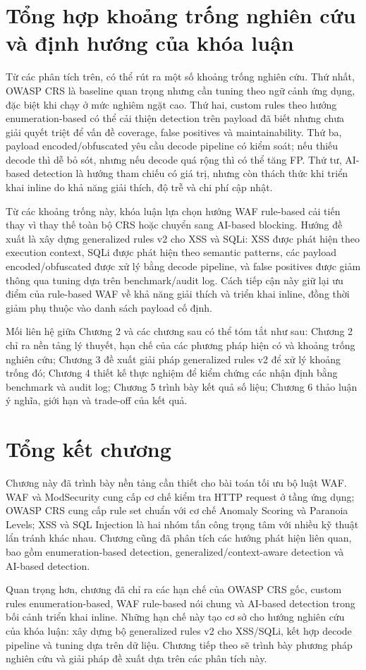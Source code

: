 \section{Tổng hợp khoảng trống nghiên cứu và định hướng của khóa luận}
\label{sec:research-gap}

Từ các phân tích trên, có thể rút ra một số khoảng trống nghiên cứu. Thứ nhất, OWASP CRS là baseline quan trọng nhưng cần tuning theo ngữ cảnh ứng dụng, đặc biệt khi chạy ở mức nghiêm ngặt cao. Thứ hai, custom rules theo hướng enumeration-based có thể cải thiện detection trên payload đã biết nhưng chưa giải quyết triệt để vấn đề coverage, false positives và maintainability. Thứ ba, payload encoded/obfuscated yêu cầu decode pipeline có kiểm soát; nếu thiếu decode thì dễ bỏ sót, nhưng nếu decode quá rộng thì có thể tăng FP. Thứ tư, AI-based detection là hướng tham chiếu có giá trị, nhưng còn thách thức khi triển khai inline do khả năng giải thích, độ trễ và chi phí cập nhật.

Từ các khoảng trống này, khóa luận lựa chọn hướng WAF rule-based cải tiến thay vì thay thế toàn bộ CRS hoặc chuyển sang AI-based blocking. Hướng đề xuất là xây dựng generalized rules v2 cho XSS và SQLi: XSS được phát hiện theo execution context, SQLi được phát hiện theo semantic patterns, các payload encoded/obfuscated được xử lý bằng decode pipeline, và false positives được giảm thông qua tuning dựa trên benchmark/audit log. Cách tiếp cận này giữ lại ưu điểm của rule-based WAF về khả năng giải thích và triển khai inline, đồng thời giảm phụ thuộc vào danh sách payload cố định.

Mối liên hệ giữa Chương 2 và các chương sau có thể tóm tắt như sau: Chương 2 chỉ ra nền tảng lý thuyết, hạn chế của các phương pháp hiện có và khoảng trống nghiên cứu; Chương 3 đề xuất giải pháp generalized rules v2 để xử lý khoảng trống đó; Chương 4 thiết kế thực nghiệm để kiểm chứng các nhận định bằng benchmark và audit log; Chương 5 trình bày kết quả số liệu; Chương 6 thảo luận ý nghĩa, giới hạn và trade-off của kết quả.

\section{Tổng kết chương}
\label{sec:chapter2-summary}

Chương này đã trình bày nền tảng cần thiết cho bài toán tối ưu bộ luật WAF. WAF và ModSecurity cung cấp cơ chế kiểm tra HTTP request ở tầng ứng dụng; OWASP CRS cung cấp rule set chuẩn với cơ chế Anomaly Scoring và Paranoia Levels; XSS và SQL Injection là hai nhóm tấn công trọng tâm với nhiều kỹ thuật lẩn tránh khác nhau. Chương cũng đã phân tích các hướng phát hiện liên quan, bao gồm enumeration-based detection, generalized/context-aware detection và AI-based detection.

Quan trọng hơn, chương đã chỉ ra các hạn chế của OWASP CRS gốc, custom rules enumeration-based, WAF rule-based nói chung và AI-based detection trong bối cảnh triển khai inline. Những hạn chế này tạo cơ sở cho hướng nghiên cứu của khóa luận: xây dựng bộ generalized rules v2 cho XSS/SQLi, kết hợp decode pipeline và tuning dựa trên dữ liệu. Chương tiếp theo sẽ trình bày phương pháp nghiên cứu và giải pháp đề xuất dựa trên các phân tích này.
